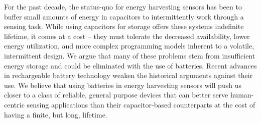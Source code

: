 
%

For the past decade, the status-quo for energy harvesting sensors
has been to buffer small amounts of energy in capacitors to
intermittently work through a sensing task. While using capacitors for storage
offers these systems indefinite lifetime, it comes at a cost --
they must tolerate the decreased availability, lower energy utilization, and more complex programming models
inherent to a volatile, intermittent design.
We argue that many of these problems stem from insufficient energy storage and
could be eliminated with the use of batteries.  Recent advances in rechargeable battery
technology weaken the
historical arguments against their use. We believe that using batteries
in energy harvesting sensors will push us closer to a class of reliable,
general purpose devices that can better serve human-centric sensing applications
than their capacitor-based counterparts at the cost of having a finite, but long, lifetime.

%
%


